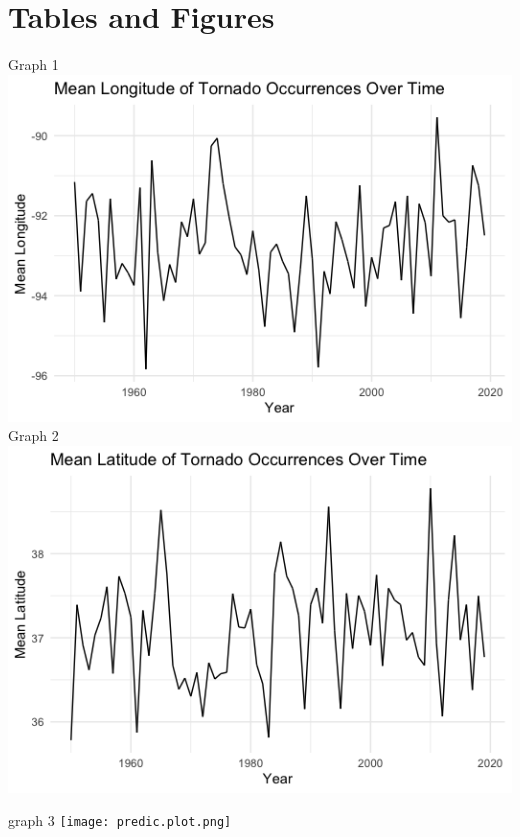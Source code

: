 \documentclass[12pt,english]{article}
\begin{document}
\section{Tables and Figures}


 
\pagebreak
Graph 1
\includegraphics[scale=0.7]{longplot.png}
\newpage
Graph 2
\includegraphics[scale=0.7]{latplot.png}


graph 3
\texttt{[image: predic.plot.png]}
\end{document}
